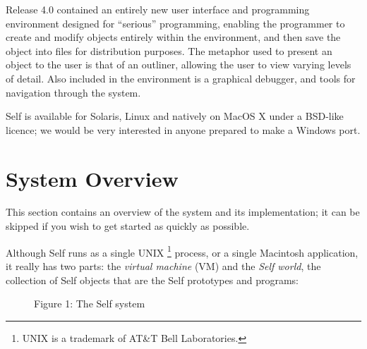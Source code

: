 \documentclass[letterpaper,10pt,english]{sphinxmanual}
\begin{document}
Release 4.0 contained an entirely new user interface and programming environment designed for “serious” programming, enabling the programmer to create and modify objects entirely within the environment, and then save the object into files for distribution purposes. The metaphor used to present an object to the user is that of an outliner, allowing the user to view varying levels of detail. Also included in the environment is a graphical debugger, and tools for navigation through the system.

Self is available for Solaris, Linux and natively on MacOS X under a BSD-like licence; we would be very interested in anyone prepared to make a Windows port.


\section{System Overview}
\label{intro:system-overview}
This section contains an overview of the system and its implementation; it can be skipped if you wish to get started as quickly as possible.

Although Self runs as a single UNIX \footnote{
UNIX is a trademark of AT\&T Bell Laboratories.
} process, or a single Macintosh application, it really has two parts: the \emph{virtual machine} (VM) and the \emph{Self world}, the collection of Self objects that are the Self prototypes and programs:
\begin{figure}[htbp]\begin{flushleft}
\capstart

\caption{Figure 1: The Self system}\end{flushleft}\end{figure}
\end{document}
